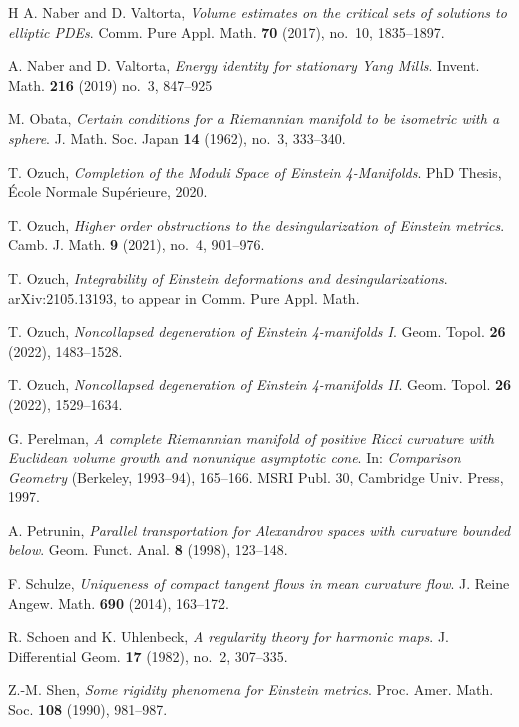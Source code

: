 \documentclass[11pt,reqno]{amsart}
\numberwithin{equation}{section}
\theoremstyle{definition}
\theoremstyle{remark}
\begin{document}
\begin{thebibliography}{H}
 A. Naber and D. Valtorta, \textit{Volume estimates on the critical sets of solutions to elliptic PDEs}. Comm. Pure Appl. Math. \textbf{70} (2017), no.~10, 1835--1897.

 A. Naber and D. Valtorta, \textit{Energy identity for stationary Yang Mills}.
Invent. Math. \textbf{216} (2019) no.~3, 847--925

M. Obata,
\textit{Certain conditions for a Riemannian manifold to be isometric with a sphere}.
J. Math. Soc. Japan \textbf{14} (1962), no.~3, 333--340.

T. Ozuch,
{\textit{Completion of the Moduli Space of Einstein 4-Manifolds}}.
PhD Thesis, École Normale Supérieure, 2020.

T. Ozuch,
\textit{Higher order obstructions to the desingularization of Einstein metrics}.
Camb. J. Math. \textbf{9} (2021), no.~4, 901--976.

T. Ozuch,
\textit{Integrability of Einstein deformations and desingularizations}.
arXiv:2105.13193, to appear in Comm. Pure Appl. Math.

T. Ozuch,
\textit{Noncollapsed degeneration of Einstein 4-manifolds I}.
Geom. Topol. \textbf{26} (2022), 1483--1528.

T. Ozuch,
\textit{Noncollapsed degeneration of Einstein 4-manifolds II}.
Geom. Topol. \textbf{26} (2022), 1529--1634.

G. Perelman,
\textit{A complete Riemannian manifold of positive Ricci curvature with Euclidean volume growth and nonunique asymptotic cone}.
In: \emph{Comparison Geometry} (Berkeley, 1993--94), 165--166.
MSRI Publ. 30, Cambridge Univ. Press, 1997.

A. Petrunin,
\textit{Parallel transportation for Alexandrov spaces with curvature bounded below}.
Geom. Funct. Anal. \textbf{8} (1998), 123--148.

F. Schulze,
\textit{Uniqueness of compact tangent flows in mean curvature flow}.
J. Reine Angew. Math. \textbf{690} (2014), 163--172.

R. Schoen and K. Uhlenbeck,
\textit{A regularity theory for harmonic maps}.
J. Differential Geom. \textbf{17} (1982), no.~2, 307--335.

Z.-M. Shen,
\textit{Some rigidity phenomena for Einstein metrics}.
Proc. Amer. Math. Soc. \textbf{108} (1990), 981--987.


\end{thebibliography}
\end{document}
